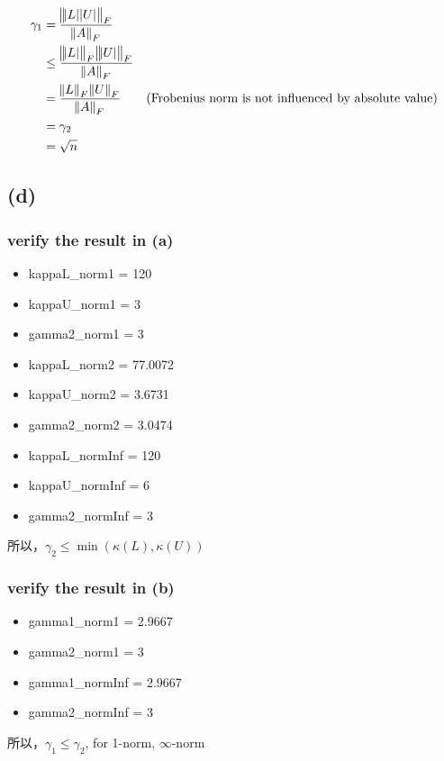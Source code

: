 \documentclass[12pt]{article}
\begin{document}
        \begin{equation*}    
            \begin{aligned}
                \gamma_1 &= \frac{\norm{\abs{L}\abs{U}}_F}{\norm{A}_F}\\
                         &\leq \frac{\norm{\abs{L}}_F\norm{\abs{U}}_F}{\norm{A}_F}\\
                         &=\frac{\norm{L}_F\norm{U}_F}{\norm{A}_F} \qquad \text{(Frobenius norm is not influenced by absolute value)}\\
                         &=\gamma_2\\
                         &= \sqrt{n}\\ 
            \end{aligned}
        \end{equation*}
    \subsection*{(d)}
        \subsubsection*{verify the result in (a)}
            \begin{itemize}
                \item kappaL\_norm1 = 120
                \item kappaU\_norm1 = 3
                \item gamma2\_norm1 = 3
                \item kappaL\_norm2 = 77.0072
                \item kappaU\_norm2 = 3.6731
                \item gamma2\_norm2 = 3.0474
                \item kappaL\_normInf = 120
                \item kappaU\_normInf = 6
                \item gamma2\_normInf = 3
            \end{itemize}
            所以，$\gamma_2\leq \min(\kappa(L),\kappa(U))$
        \subsubsection*{verify the result in (b)}
            \begin{itemize}
                \item gamma1\_norm1 = 2.9667
                \item gamma2\_norm1 = 3
                \item gamma1\_normInf = 2.9667
                \item gamma2\_normInf = 3
            \end{itemize}
            所以，$\gamma_1\leq \gamma_2$, for 1-norm, $\infty$-norm
\newpage
\end{document}
